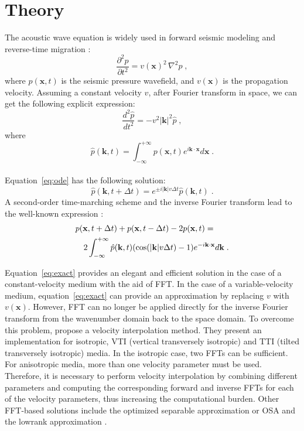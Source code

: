 \section{Theory}

The acoustic wave equation is widely used in 
forward seismic modeling and reverse-time migration \cite[]{bednar,etgen1}:
\begin{equation}
\label{eq:acoustic} 
\frac{\partial^2p}{\partial t^2} = v(\mathbf{x})^2\,\nabla^2p\;,
\end{equation}
where $p(\mathbf{x},t)$ is the seismic pressure wavefield, 
and $v(\mathbf{x})$ is the propagation velocity.
Assuming a constant velocity $v$, after Fourier transform in space,
 we can get the following explicit expression:
\begin{equation}
\label{eq:ode} 
\frac{d^2\hat{p}}{dt^2} = - v^2|\mathbf{k}|^2\hat{p}\;,
\end{equation}
where
\begin{equation}
\label{eq:p} 
\hat{p}(\mathbf{k},t)=\int^{+\infty}_{-\infty}{p(\mathbf{x},t)e^{i\mathbf{k}\cdot\mathbf{x}}d\mathbf{x}}\;.
\end{equation}
\\
Equation~\ref{eq:ode} has the following solution:
\begin{equation}
\label{eq:fourier} 
\hat{p}(\mathbf{k},t+\Delta t) = e^{\pm i|\mathbf{k}|v\Delta t}\hat{p}(\mathbf{k},t)\;.
\end{equation}
A second-order time-marching scheme and the inverse Fourier transform lead to 
the well-known expression \cite[]{Etgen.sep.60.131,yu}:
\begin{eqnarray}
\label{eq:exact} 
\lefteqn{p(\mathbf{x},t+\Delta t)+p(\mathbf{x},t-\Delta t)-2p(\mathbf{x},t)  = }\nonumber \\
& & 2\int^{+\infty}_{-\infty}{\hat{p}(\mathbf{k},t)(\cos(|\mathbf{k}|v\Delta t)-1)e^{-i\mathbf{k}\cdot\mathbf{x}}d\mathbf{k}}\;.
\end{eqnarray} 


Equation~\ref{eq:exact} provides an elegant and efficient solution 
in the case of a constant-velocity medium with the aid of FFT. 
In the case of a variable-velocity medium, 
equation~\ref{eq:exact} can provide an approximation by replacing $v$ with $v(\mathbf{x})$. 
However, FFT can no longer be applied directly for 
the inverse Fourier transform from the wavenumber domain back to the space domain.
To overcome this problem, \cite{etgen} propose a velocity interpolation method. 
They present an implementation for isotropic, VTI (vertical transversely isotropic) and TTI (tilted transversely isotropic) media.  
In the isotropic case, two FFTs can be sufficient. 
For anisotropic media, more than one velocity parameter must be used. 
Therefore, it is necessary to perform velocity interpolation 
by combining different parameters and 
computing the corresponding forward and inverse FFTs 
for each of the velocity parameters, thus increasing the computational burden.
Other FFT-based solutions include the optimized separable approximation or OSA \cite[]{song,morton,zhang,du} 
and the lowrank approximation \cite[]{ying}.

